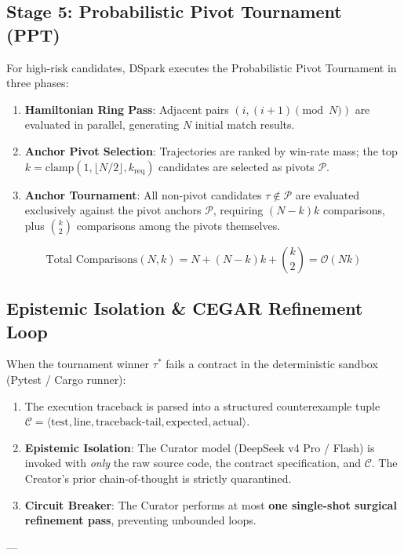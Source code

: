 \documentclass[10pt,twocolumn,letterpaper]{article}
\begin{document}
\subsection{Stage 5: Probabilistic Pivot Tournament (PPT)}
For high-risk candidates, DSpark executes the Probabilistic Pivot Tournament in three phases:
\begin{enumerate}
    \item \textbf{Hamiltonian Ring Pass}: Adjacent pairs $(i, (i+1) \pmod N)$ are evaluated in parallel, generating $N$ initial match results.
    \item \textbf{Anchor Pivot Selection}: Trajectories are ranked by win-rate mass; the top $k = \mathrm{clamp}(1, \lfloor N/2 \rfloor, k_{\text{req}})$ candidates are selected as pivots $\mathcal{P}$.
    \item \textbf{Anchor Tournament}: All non-pivot candidates $\tau \notin \mathcal{P}$ are evaluated exclusively against the pivot anchors $\mathcal{P}$, requiring $(N-k)k$ comparisons, plus $\binom{k}{2}$ comparisons among the pivots themselves.
\end{enumerate}

\begin{equation}
\text{Total Comparisons}(N, k) = N + (N-k)k + \binom{k}{2} = \mathcal{O}(Nk)
\end{equation}

\subsection{Epistemic Isolation \& CEGAR Refinement Loop}
When the tournament winner $\tau^*$ fails a contract in the deterministic sandbox (Pytest / Cargo runner):
\begin{enumerate}
    \item The execution traceback is parsed into a structured counterexample tuple $\mathcal{C} = \langle \text{test}, \text{line}, \text{traceback-tail}, \text{expected}, \text{actual} \rangle$.
    \item \textbf{Epistemic Isolation}: The Curator model (DeepSeek v4 Pro / Flash) is invoked with \textit{only} the raw source code, the contract specification, and $\mathcal{C}$. The Creator's prior chain-of-thought is strictly quarantined.
    \item \textbf{Circuit Breaker}: The Curator performs at most \textbf{one single-shot surgical refinement pass}, preventing unbounded loops.
\end{enumerate}

---
\end{document}
